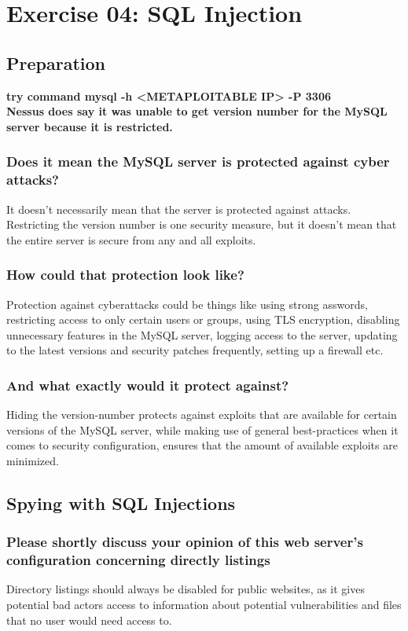 \section{Exercise 04: SQL Injection}

\subsection{Preparation}
\textbf{try command mysql -h <METAPLOITABLE IP> -P 3306}\\
\textbf{Nessus does say it was unable to get version number for the MySQL server because it is restricted.}
\subsubsection{Does it mean the MySQL server is protected against cyber attacks?}
It doesn't necessarily mean that the server is protected against attacks. Restricting the version number is one security measure, but it doesn't mean that the entire server is secure from any and all exploits.

\subsubsection{How could that protection look like?}
Protection against cyberattacks could be things like using strong asswords, restricting access to only certain users or groups, using TLS encryption, disabling unnecessary features in the MySQL server, logging access to the server, updating to the latest versions and security patches frequently, setting up a firewall etc.
\subsubsection{And what exactly would it protect against?}
Hiding the version-number protects against exploits that are available for certain versions of the MySQL server, while making use of general best-practices when it comes to security configuration, ensures that the amount of available exploits are minimized.

\subsection{Spying with SQL Injections}
\subsubsection{Please shortly discuss your opinion of this web server's configuration concerning directly listings}
Directory listings should always be disabled for public websites, as it gives potential bad actors access to information about potential vulnerabilities and files that no user would need access to.

